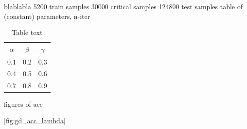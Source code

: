 blablabla
5200 train samples
30000 critical samples
124800 test samples
table of (constant) parameters, n-iter

\begin{table}[H]
\caption{Table text}
\centering
{}
\begin{tabular}{ccc}
\hline
\hline 
$\alpha$ & $\beta$ & $\gamma$
\\
\hline 
\hline 
0.1 & 0.2 & 0.3
\\
0.4 & 0.5 & 0.6
\\
0.7 & 0.8 & 0.9
\\
\hline
\end{tabular}
\label{tab:tab1}
\end{table}


figures of acc 

\autoref{fig:gd_acc_lambda}

